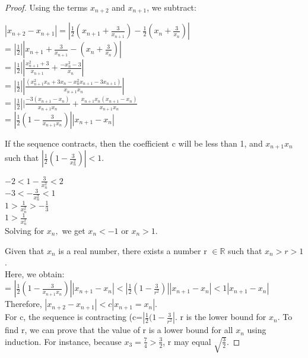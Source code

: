 \documentclass[12pt]{article}
\theoremstyle{definition}
\numberwithin{equation}{subsection}
\begin{document}
\begin{proof}
Using the terms $x_{n+2}$ and $x_{n+1}$, we subtract:
\begin{center}
$|x_{n+2} - x_{n+1}| = |\frac{1}{2}(x_{n+1} + \frac{3}{x_{n+1}}) - \frac{1}{2}(x_{n} + \frac{3}{x_{n}})|$
\\
= $|\frac{1}{2}||x_{n+1} + \frac{3}{x_{n+1}} - (x_{n} + \frac{3}{x_{n}})|$
\\
= $|\frac{1}{2}||\frac{x^2_{n+1}+3}{x_{n+1}} + \frac{-x^2_{n}-3}{x_{n}}|$
\\
= $|\frac{1}{2}||\frac{(x^2_{n+1}x_{n}+3x_{n}-x^2_{n}x_{n+1}-3x_{n+1})}{x_{n+1}x_{n}}|$
\\
= $|\frac{1}{2}||\frac{-3(x_{n+1}-x_{n})}{x_{n+1}x_{n}}+\frac{x_{n+1}x_{n}(x_{n+1}-x_{n})}{x_{n+1}x_{n}}$
\\
= $|\frac{1}{2}(1-\frac{3}{x_{n+1}x_{n}})||x_{n+1}-x_{n}|$
\end{center}
If the sequence contracts, then the coefficient c will be less than 1, and $x_{n+1} $\approx$ x_{n}$ such that $|\frac{1}{2}(1-\frac{3}{x^2_{n}})|<1$.
\begin{center}
    $-2<1-\frac{3}{x^2_{n}}<2$ \\
    $-3<-\frac{3}{x^2_{n}}<1$ \\
    $1>\frac{1}{x^2_{n}}>-\frac{1}{3}$ \\ 
    $1>\frac{1}{x^2_{n}}$ \\ Solving for $x_{n},$ we get $x_{n}<-1$ or $x_{n}>1$.
\end{center}
Given that $x_{n}$ is a real number, there exists a number r $\in \mathbb{R}$ such that $x_{n} > r >1$. 
\\
Here, we obtain:
\\
= $|\frac{1}{2}(1-\frac{3}{x_{n+1}x_{n}})||x_{n+1}-x_{n}|<|\frac{1}{2}(1-\frac{3}{r^2})||x_{n+1}-x_{n}|<1|x_{n+1}-x_{n}|$
\\
Therefore, $|x_{n+2} - x_{n+1}| < c|x_{n+1}=x_{n}|$. \\ For c, the sequence is contracting (c=$|\frac{1}{2}(1-\frac{3}{r^2}|$.
r is the lower bound for $x_{n}$. To find r, we can prove that the value of r is a lower bound for all $x_{n}$ using induction.
For instance, because $x_{3} = \frac{7}{4} > \frac{3}{2}$, r may equal $\sqrt{\frac{3}{2}}$. 


\end{proof}
\end{document}
